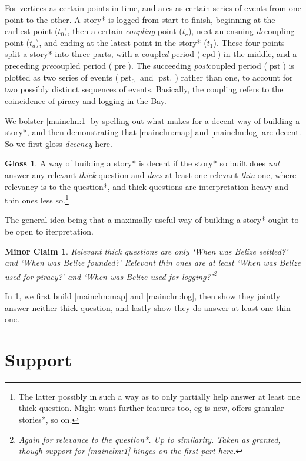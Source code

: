 \documentclass{amsart}
\newcommand{\mention}[1]{\textit{#1}}%
\DeclareMathOperator{\pre}{pre}%
\DeclareMathOperator{\pst}{pst}%
\DeclareMathOperator{\cpd}{cpd}%
\newtheorem{minrclm}{Minor Claim}%
\theoremstyle{definition}
\newtheorem{gloss}{Gloss}%
\theoremstyle{remark}
\begin{document}
	For vertices as certain points in time, and arcs as certain series of events from one point to the other. A story* is logged from start to finish, beginning at the earliest point (\(t_{0}\)), then a certain \mention{coupling} point (\(t_{c}\)), next an ensuing \mention{de}coupling point (\(t_{d}\)), and ending at the latest point in the story* (\(t_{1}\)). These four points split a story* into three parts, with a coupl\mention{ed} period (\(\cpd\)) in the middle, and a preceding \mention{pre}coupled period (\(\pre\)). The succeeding \mention{post}coupled period (\(\pst\)) is plotted as two series of events (\(\pst_{0}\) and \(\pst_{1}\)) rather than one, to account for two possibly distinct sequences of events. Basically, the coupling refers to the coincidence of piracy and logging in the Bay.
	
	We bolster \ref{mainclm:1} by spelling out what makes for a decent way of building a story*, and then demonstrating that \ref{mainclm:map} and \ref{mainclm:log} are decent. So we first gloss \mention{decency} here.
	\begin{gloss}
	\label{gloss:decency}
		A way of building a story* is decent if the story* so built does \emph{not} answer any relevant \mention{thick} question and \emph{does} at least one relevant \mention{thin} one, where relevancy is to the question*, and thick questions are interpretation-heavy and thin ones less so.\footnote{The latter possibly in such a way as to only partially help answer at least one thick question. Might want further features too, eg is new, offers granular stories*, so on.}
	\end{gloss}
	The general idea being that a maximally useful way of building a story* ought to be open to iterpretation.
	\begin{minrclm}
	\label{minrclm:questions}
	Relevant thick questions are only `When was Belize settled?' and `When was Belize founded?' Relevant thin ones are at least `When was Belize used for piracy?' and `When was Belize used for logging?'\footnote{Again for relevance to the question*. Up to similarity. Taken as granted, though support for \ref{mainclm:1} hinges on the first part here.}
	\end{minrclm}
	In \ref{s:support}, we first build \ref{mainclm:map} and \ref{mainclm:log}, then show they jointly answer neither thick question, and lastly show they do answer at least one thin one.
%
%
%
\section{Support}
	\label{s:support}
\end{document}
